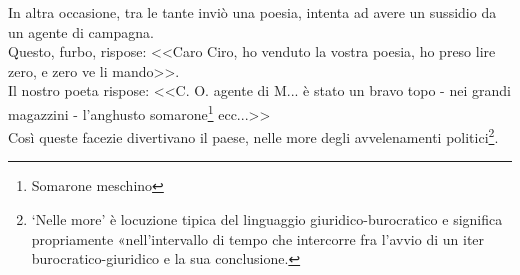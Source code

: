 In altra occasione, tra le tante inviò una poesia, intenta ad avere un sussidio da un agente di campagna. \\
\indent Questo, furbo, rispose: <<Caro Ciro, ho venduto la vostra poesia, ho preso lire zero, e zero ve li mando>>.\\
\indent Il nostro poeta rispose: <<C. O. agente di M... è stato un bravo topo - nei grandi magazzini - l'anghusto somarone\footnote{Somarone meschino} ecc...>>\\
\indent Così queste facezie divertivano il paese, nelle more degli avvelenamenti politici\footnote{`Nelle more' è locuzione tipica del linguaggio giuridico-burocratico e significa propriamente «nell'intervallo di tempo che intercorre fra l'avvio di un iter burocratico-giuridico e la sua conclusione.}. 




























%
